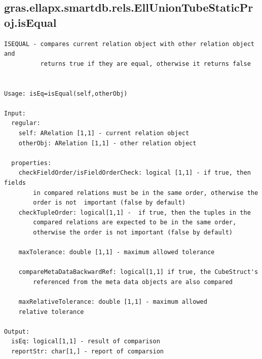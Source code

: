\documentclass[letterpaper,10pt,english]{sphinxmanual}
\begin{document}
\subsection{gras.ellapx.smartdb.rels.EllUnionTubeStaticProj.isEqual}
\label{chap_functions:gras-ellapx-smartdb-rels-elluniontubestaticproj-isequal}
\begin{Verbatim}[commandchars=\\\{\}]
ISEQUAL - compares current relation object with other relation object and
          returns true if they are equal, otherwise it returns false


Usage: isEq=isEqual(self,otherObj)

Input:
  regular:
    self: ARelation [1,1] - current relation object
    otherObj: ARelation [1,1] - other relation object

  properties:
    checkFieldOrder/isFieldOrderCheck: logical [1,1] - if true, then fields
        in compared relations must be in the same order, otherwise the
        order is not  important (false by default)
    checkTupleOrder: logical[1,1] -  if true, then the tuples in the
        compared relations are expected to be in the same order,
        otherwise the order is not important (false by default)

    maxTolerance: double [1,1] - maximum allowed tolerance

    compareMetaDataBackwardRef: logical[1,1] if true, the CubeStruct's
        referenced from the meta data objects are also compared

    maxRelativeTolerance: double [1,1] - maximum allowed
    relative tolerance

Output:
  isEq: logical[1,1] - result of comparison
  reportStr: char[1,] - report of comparsion
\end{Verbatim}
\end{document}
